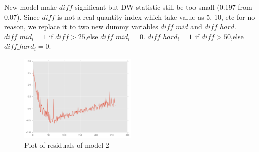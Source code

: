 \documentclass{beamer}
\begin{document}
\begin{frame}
\end{frame}

\begin{frame}

New model make $diff$ significant but DW statistic still be too small (0.197 from 0.07). 
Since $diff$ is not a real quantity index which take value as 5, 10, etc for no reason,
we replace it to two new dummy variables $diff\_mid$ and $diff\_hard$. 
$diff\_mid_i=1$ if $diff > 25$,else $diff\_mid_i=0$.
$diff\_hard_i=1$ if $diff > 50$,else $diff\_hard_i=0$.


\begin{figure}[h]
\includegraphics[width=0.5\textwidth, inner]{model2-resid.png}
\caption{Plot of residuals of model 2}
\end{figure}


\end{frame}
\end{document}
